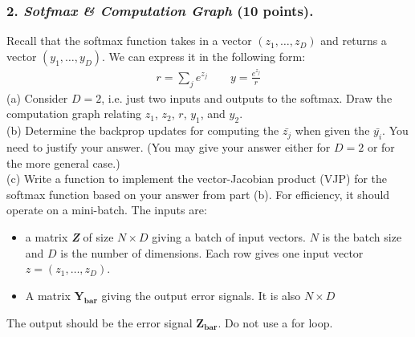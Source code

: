 \documentclass[12pt]{article}%
\begin{document}
\subsubsection*{2. \textit{Sotfmax \& Computation Graph} (10 points).}
Recall that the softmax function takes in a vector $(z_1, \dots , z_D)$ and returns a
vector $(y_1, \dots , y_D)$. We can express it in the following form:
\begin{equation*}
    \begin{split}
    r = \sum_j e^{z_j}   \qquad y = \frac{e^{z_j}}{r}
\end{split}
\end{equation*}
(a) Consider $D = 2$, i.e. just two inputs and outputs to the softmax. Draw the
computation graph relating $z_1$, $z_2$, $r$, $y_1$, and $y_2$.
\vspace{1em}
\\
(b) Determine the backprop updates for computing the $\bar{z_j}$ when given the $\bar{y_i}$.
You need to justify your answer. (You may give your answer either for
$D = 2$ or for the more general case.)
\vspace{1em}
\\
(c) Write a function to implement the vector-Jacobian product (VJP) for the
softmax function based on your answer from part (b). For efficiency, it should
operate on a mini-batch.
The inputs are:
\begin{itemize}
    \item a matrix \textit{\textbf{Z}} of size $N \times D$ giving a batch of input vectors. $N$ is the batch
size and $D$ is the number of dimensions. Each row gives one input vector
$z = (z_1, \dots , z_D)$.
    \item A matrix $\mathbf{Y_{bar}}$ giving the output error signals. It is also $N \times D$
\end{itemize} 
\indent The output should be the error signal $\mathbf{Z_{bar}}$. Do not use a for loop.
\end{document}
